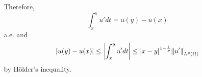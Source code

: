 \documentclass{article}
\begin{document}
Therefore,
\begin{equation*}
\int_x^y u' dt = u(y) - u(x)
\end{equation*}
a.e. and
\begin{equation*}
\abs{u(y)-u(x)}\leq \abs{\int_x^y u' dt} \leq \abs{x-y}^{1-\frac{1}{p}}\norm{u'}_{L^p(\Omega)}
\end{equation*}
by H\"older's inequality.
\end{document}
